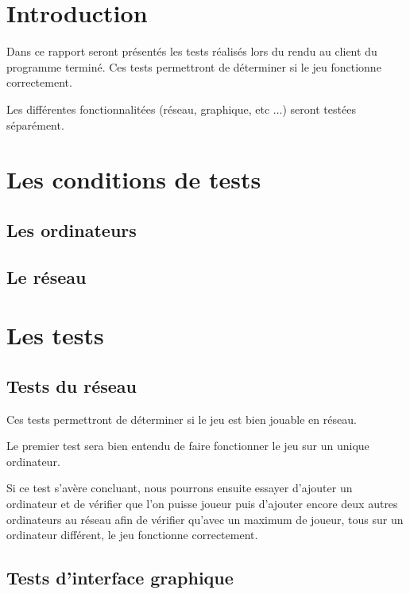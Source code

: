\section*{Introduction}

Dans ce rapport seront présentés les tests réalisés lors du rendu au client du programme terminé. Ces tests permettront de déterminer si le jeu fonctionne correctement.

Les différentes fonctionnalitées (réseau, graphique, etc ...) seront testées séparément.

\newpage

\section{Les conditions de tests}


\subsection{Les ordinateurs}

\subsection{Le réseau}

\newpage

\section{Les tests}

\subsection{Tests du réseau}

Ces tests permettront de déterminer si le jeu est bien jouable en réseau.

Le premier test sera bien entendu de faire fonctionner le jeu sur un unique ordinateur.

Si ce test s'avère concluant, nous pourrons ensuite essayer d'ajouter un ordinateur et de vérifier que l'on puisse joueur puis d'ajouter encore deux autres ordinateurs au réseau afin de vérifier qu'avec un maximum de joueur, tous sur un ordinateur différent, le jeu fonctionne correctement.

\subsection{Tests d'interface graphique}

